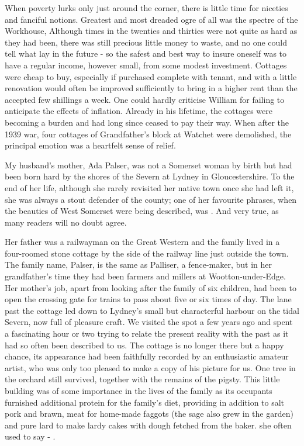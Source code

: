 When poverty lurks only just around the corner, there is little time for niceties and fanciful notions. Greatest and most dreaded ogre of all was the spectre of the Workhouse, Although times in the twenties and thirties were not quite as hard as they had been, there was still precious little money to waste, and no one could tell what lay in the future - so the safest and best way to insure oneself was to have a regular income, however small, from some modest investment. Cottages were cheap to buy, especially if purchased complete with tenant, and with a little renovation would often be improved sufficiently to bring in a higher rent than the accepted few shillings a week. One could hardly criticise William for failing to anticipate the effects of inflation. Already in his lifetime, the cottages were becoming a burden and had long since ceased to pay their way. When after the 1939 war, four cottages of Grandfather’s block at Watchet were demolished, the principal emotion was a heartfelt sense of relief.
 
\Flourish	 

My husband's mother, Ada Palser, was not a Somerset woman by birth but had been born hard by the shores of the Severn at Lydney in Gloucestershire. To the end of her life, although she rarely revisited her native town once she had left it, she was always a stout defender of the county; one of her favourite phrases, when the beauties of West Somerset were being described, was . And very true, as many readers will no doubt agree.

Her father was a railwayman on the Great Western and the family lived in a four-roomed stone cottage by the side of the railway line just outside the town. The family name, Palser, is the same as Palliser, a fence-maker, but in her grandfather's time they had been farmers and millers at Wootton-under-Edge. Her mother's job, apart from looking after the family of six children, had been to open the crossing gate for trains to pass about five or six times of day. The lane past the cottage led down to Lydney's small but characterful harbour on the tidal Severn, now full of pleasure craft. We visited the spot a few years ago and spent a fascinating hour or two trying to relate the present reality with the past as it had so often been described to us. The cottage is no longer there but a happy chance, its appearance had been faithfully recorded by an enthusiastic amateur artist, who was only too pleased to make a copy of his picture for us. One tree in the orchard still survived, together with the remains of the pigsty. This little building was of some importance in the lives of the family as its occupants furnished additional protein for the family's diet, providing in addition to salt pork and brawn, meat for home-made faggots (the sage also grew in the garden) and pure lard to make lardy cakes with dough fetched from the baker.  she often used to say - .

